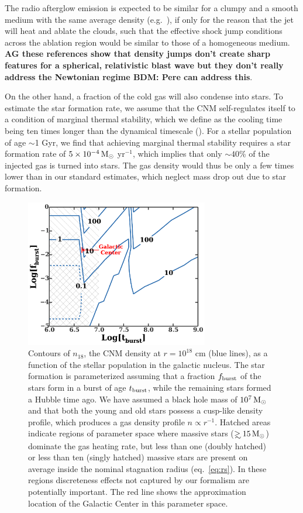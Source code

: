 \documentclass[usenatbib,fleqn]{mnras}
\newcommand\gsim{\mathrel{\rlap{\lower4pt\hbox{\hskip1pt$\sim$}}
    \raise1pt\hbox{$>$}}}
\newcommand{\Msun}{{\rm M_\odot}}
\begin{document}
The radio afterglow emission is expected to be similar for a clumpy
and a smooth medium with the same average density
(e.g.~\citealt{Nakar&Granot2007,van-Eerten+2009,Mimica&Giannios2011}),
if only for the reason that the jet will heat and ablate the clouds,
such that the effective shock jump conditions across the ablation
region would be similar to those of a homogeneous medium.  {\bf AG
  these references show that density jumps don't create sharp features
  for a spherical, relativistic blast wave but they don't really
  address the Newtonian regime BDM: Pere can address this}.

On the other hand, a fraction of the cold gas will also condense into
stars.  To estimate the star formation rate, we assume that the CNM
self-regulates itself to a condition of marginal thermal stability,
which we define as the cooling time being ten times longer than the
dynamical timescale (\citealt{McCourt+2012}). For a stellar population
of age $\sim$1 Gyr, we find that achieving marginal thermal stability
requires a star formation rate of $5\times 10^{-4} \,\Msun$ yr$^{-1}$,
which implies that only $\sim 40$\% of the injected gas is turned into
stars.  The gas density would thus be only a few times lower than in
our standard estimates, which neglect mass drop out due to star
formation.

\begin{figure} 
  \includegraphics[width=8cm]{cnm_plot.pdf}
  \caption{\label{fig:param} Contours of $n_{18}$, the CNM density at
    $r = 10^{18}$ cm (blue lines), as a function of the stellar
    population in the galactic nucleus.  The star formation is
    parameterized assuming that a fraction $f_{\rm burst}$ of the
    stars form in a burst of age $t_{\rm burst}$, while the remaining
    stars formed a Hubble time ago.  We have assumed a black hole mass
    of $10^{7} \, \Msun$ and that both the young and old stars possess
    a cusp-like density profile, which produces a gas density profile
    $n \propto r^{-1}$.  Hatched areas indicate regions of parameter
    space where massive stars ($\gsim 15 \, \Msun$) dominate the gas
    heating rate, but less than one (doubly hatched) or less than ten
    (singly hatched) massive stars are present on average inside the
    nominal stagnation radius (eq.~\ref{eq:rs}).  In these regions
    discreteness effects not captured by our formalism are potentially
    important. The red line shows the approximation location of the
    Galactic Center in this parameter space.}
\end{figure}
\end{document}
